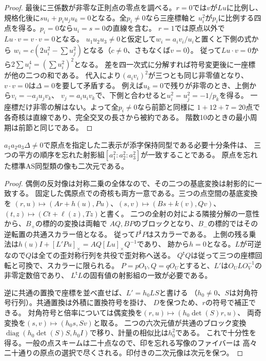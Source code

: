 \begin{proof}
最後に三係数が非零な正則点の零点を調べる。$r=0$では$v$が$Lu$に比例し、
規格化後に$s u_i+p_i u_j u_k=0$となる。全$p_i\ne0$なら三座標軸と
$u_i^2$が$p_i$に比例する四点を得る。$p_i=0$なら$u_i=s=0$の直線を含む。
$r=1$では原点以外で$Lu\cdot v=v\cdot v=0$となる。
$u_1u_2u_3\ne0$と仮定して$w_i=a_i v_i/u_i$と置くと下側の式から
$w_i=c(2u_i^2-\sum u_j^2)$となる（$c\ne0$、さもなくば$v=0$）。
従って$Lu\cdot v=0$から$2\sum u_i^4=(\sum u_i^2)^2$となる。
差を四一次式に分解すれば符号変更後に一座標が他の二つの和である。
代入により$(a_i v_i)^2$が三つとも同じ非零値となり、
$v\cdot v=0$は$\Delta=0$を要して矛盾する。
例えば$u_k=0$で残りが非零のとき、上側から$v_i=-a_j u_j v_k$、
$v_j=a_i u_i v_k$で、下側と合わせると$u_i^2=u_j^2=-1/p_k$を得る。
一座標だけ非零の解はない。よって全$p_i\ne0$なら前節と同様に
$1+12+7=20$点で各奇核は直線であり、完全交叉の長さから被約である。
階数10のときの最小周期は前節と同じである。
\end{proof}

\begin{proposition}[原点を指定した同型と像の次元]\label{prop:cross-product-marked-isom}
$a_1a_2a_3\Delta\ne0$で原点を指定した二表示が添字保持同型である必要十分条件は、
三つの平方の順序を忘れた射影組$[a_1^2:a_2^2:a_3^2]$が一致することである。
原点を忘れた標準AS同型類の像も二次元である。
\end{proposition}
\begin{proof}
偶側の反対像は対称二乗の全体なので、その二つの基底変換は射影的に一致する。
固定した偶原点での奇核も両方一意である。三つの点空間の基底変換を
$(r,u)\mapsto(Ar+h(u),P u)$、$(s,v)\mapsto(Bs+k(v),Qv)$、
$(t,z)\mapsto(Ct+\ell(z),Tz)$と書く。
二つの全射の対による隣接分解の一意性から、$B_+$の標的の変換は両軸で
$AQ,BP$のブロックとなり、$B_-$の標的ではその逆転置の共通スカラー倍となる。
従って$P^{\mathsf t}P$はスカラーである。
上側の残る乗法は$h(u)I+[L'Pu]_\times=A Q[Lu]_\times Q^{-1}$であり、
跡から$h=0$となる。$L$が可逆なので$Q$は全ての歪対称行列を共役で歪対称へ送る。
$Q^{\mathsf t}Q$は従って三つの座標回転と可換で、スカラーに限られる。
$P=pO_V,Q=qO_U$とすると、$L'$は$O_U L O_V^{-1}$の非零定数倍であり、
$L^{\mathsf t}L$の固有値の射影組の一致が必要である。

逆に共通の置換で座標を並べ直せば、$L'=h_0 L S$と書ける
（$h_0\ne0$、$S$は対角符号行列）。共通置換は外積に置換符号を掛け、
$D$を保つため、$r$の符号で補正できる。
対角符号と倍率については偶変換を$(r,u)\mapsto(h_0\det(S) r,u)$、
両奇変換を$(s,v)\mapsto(h_0s,Sv)$と取る。
二つの六次元値が共通のブロック変換
$\operatorname{diag}(h_0\det(S) S,h_0 I)$で移り、計量の相似比は$h_0^2$である。
これで十分性を得る。一般の点スキームは二十点なので、印を忘れる写像のファイバーは
高々二十通りの原点の選択で尽くされる。印付きの二次元像は次元を保つ。
\end{proof}

